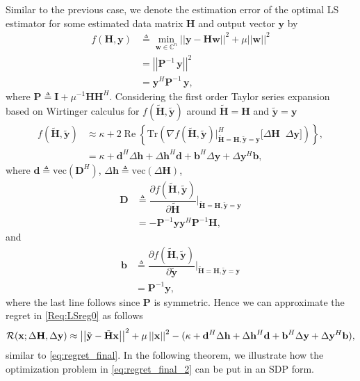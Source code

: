\documentclass[review,sort&compress]{elsarticle}
\renewcommand{\vec}[1]{\mbox{$\mathbf{#1}$}}
\newcommand{\norm}[1]{\left|\left|#1\right|\right|}
\newcommand{\defi}{\triangleq}
\newcommand{\tr}{\mathrm{Tr}}
\newcommand{\col}{\mathrm{vec}}
\newcommand{\nn}{\nonumber}
\newcommand{\C}{\mathbb{C}}
\newcommand{\R}{{\cal R}}
\newcommand{\vH}{\vec{H}}
\newcommand{\vx}{\vec{x}}
\newcommand{\vy}{\vec{y}}
\newcommand{\dH}{\Delta\vH}
\newcommand{\dy}{\Delta\vy}
\newcommand{\tH}{\tilde{\vec{H}}}
\newcommand{\ty}{\tilde{\vec{y}}}
\newcommand{\vP}{\vec{P}}
\newcommand{\vD}{\vec{D}}
\newcommand{\vd}{\vec{d}}
\newcommand{\dvh}{\Delta\vec{h}}
\newcommand{\vI}{\vec{I}}
\newcommand{\vb}{\vec{b}}
\newcommand{\vw}{\vec{w}}
\begin{document}
Similar to the previous case, we denote the estimation error of the optimal LS estimator for some estimated data matrix $\vH$ and output vector $\vy$ by
\begin{align}
  f(\vH, \vy) & \defi \min_{\vw \in \C^n}{\norm{\vy - \vH \vw}}^2 + \mu \norm{\vw}^2 \nn\\
              & = \norm{\vP^{-1} \, \vy}^2 \nn\\
              & = \vy^H \vP^{-1} \, \vy, \nn
\end{align}
where $\vP \defi \vI + \mu^{-1}\vH\vH^H$. Considering the first order Taylor series expansion based on Wirtinger calculus \cite{graham} for $f(\tH, \ty)$ around $\tH = \vH$ and $\ty = \vy$
\begin{align}
f(\tH, \ty) & \approx \kappa + 2\operatorname{Re} \left\{ \tr\left( \nabla f(\tH, \ty)\big\vert_{\tH=\vH, \ty = \vy}^H \big[\dH \;\; \dy\big] \right) \right\}, \nn\\
            & = \kappa + \vd^H \dvh + \dvh^H \vd + \vb^H \dy + \dy^H \vb, \nn
\end{align}
where $\vd \defi \col(\vD^H)$, $\dvh \defi \col(\dH)$,
\begin{align}
  \vD & \defi \dfrac{\partial f(\tH, \ty)}{\partial \tH}\bigg\vert_{\tH=\vH, \ty=\vy} \nn\\
      & = - \vP^{-1} \vy \vy^H \vP^{-1} \vH,
\end{align}
and
\begin{align}
  \vb & \defi \dfrac{\partial f(\tH, \ty)}{\partial \ty}\bigg\vert_{\tH=\vH, \ty=\vy} \nn\\
      & = \vP^{-1} \vy, \nn
\end{align}
where the last line follows since $\vP$ is symmetric. Hence we can approximate the regret in \eqref{Req:LSreg0} as follows
\begin{equation}\label{eq:regret_final_2}
  \R(\vx; \dH, \dy) \approx {\norm{\ty - \tH \vx}}^2 + \mu \norm{\vx}^2 - (\kappa + \vd^H \dvh + \dvh^H \vd + \vb^H \dy + \dy^H \vb),
\end{equation}
similar to \eqref{eq:regret_final}. In the following theorem, we illustrate how the optimization problem in \eqref{eq:regret_final_2} can be put in an SDP form.
\end{document}
